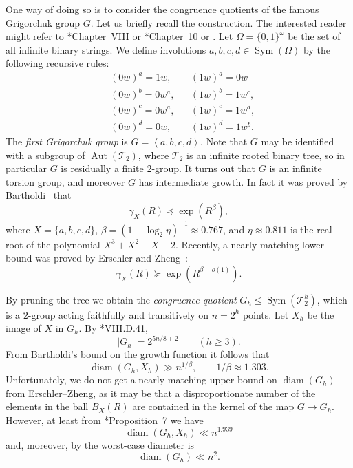 \documentclass[11pt,reqno]{amsart}
\numberwithin{equation}{section}
\theoremstyle{definition}
\theoremstyle{remark}
\def\T{\mathcal{T}} %
\newcommand\opr[1]{\operatorname{#1}}
\def\Sym{\opr{Sym}}
\def\Aut{\opr{Aut}}
\def\diam{\opr{diam}}
\newcommand\gen[1]{\left\langle#1\right\rangle}
\numberwithin{equation}{section}
\begin{document}
One way of doing so is to consider the congruence quotients of the famous Grigorchuk group $G$. Let us briefly recall the construction. The interested reader might refer to \cite{dlH}*{Chapter~VIII} or \cite{mann}*{Chapter~10} or \cite{BGS-branch-groups-book}.
Let $\Omega = \{0,1\}^\omega$ be the set of all infinite binary strings.
We define involutions $a, b, c, d \in \Sym(\Omega)$ by the following recursive rules:
\begin{align*}
    &(0w)^a = 1w, && (1w)^a = 0w \\
    &(0w)^b = 0w^a, && (1w)^b = 1w^c, \\
    &(0w)^c = 0w^a, && (1w)^c = 1w^d, \\
    &(0w)^d = 0w, && (1w)^d = 1w^b.
\end{align*}
The \emph{first Grigorchuk group} is $G = \gen {a,b,c,d}$.
Note that $G$ may be identified with a subgroup of $\Aut(\T_2)$, where $\T_2$ is an infinite rooted binary tree,
so in particular $G$ is residually a finite $2$-group.
It turns out that $G$ is an infinite torsion group, and moreover $G$ has intermediate growth.
In fact it was proved by Bartholdi~\cite{bartholdi} that
\[
    \gamma_X(R) \preceq \exp(R^\beta),
\]
where $X = \{a, b, c, d\}$, $\beta = (1 - \log_2 \eta)^{-1} \approx 0.767$, and $\eta \approx 0.811$ is the real root of the polynomial $X^3 + X^2 + X - 2$.
Recently, a nearly matching lower bound was proved by Erschler and Zheng~\cite{erschler--zheng}:
\[
    \gamma_X(R) \succeq \exp(R^{\beta - o(1)}).
\]

By pruning the tree we obtain the \emph{congruence quotient} $G_h \le \Sym(\T_2^h)$, which is a $2$-group acting faithfully and transitively on $n = 2^h$ points.
Let $X_h$ be the image of $X$ in $G_h$.
By \cite{dlH}*{VIII.D.41},
\[
    |G_h| = 2^{5n/8 + 2} \qquad (h \ge 3).
\]
From Bartholdi's bound on the growth function it follows that
\[
    \diam(G_h, X_h) \gg n^{1/\beta}, \qquad 1 / \beta \approx 1.303.
\]
Unfortunately, we do not get a nearly matching upper bound on $\diam(G_h)$ from Erschler--Zheng, as it may be that a disproportionate number of the elements in the ball $B_X(R)$ are contained in the kernel of the map $G \to G_h$.
However, at least from \cite{bartholdi-lower}*{Proposition~7} we have
\[
    \diam(G_h, X_h) \ll n^{1.939}
\]
and, moreover, by  the worst-case diameter is
\[
    \diam(G_h) \ll n^2.
\]
\end{document}
